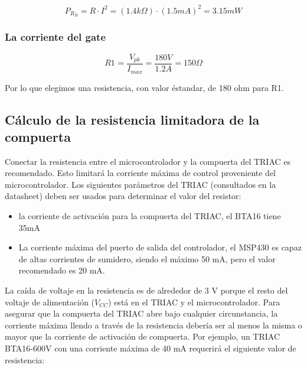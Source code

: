     \begin{equation}
        P_{R_{B}}
        =   R \cdot I^2
        =   (1.4k\Omega) \cdot (1.5mA)^2
        =   3.15mW
    \end{equation}
    
    \subsubsection*{La corriente del gate}
        \begin{equation}
            R1_{ }   
            =   \frac { V_{pk} } { I_{max} }    
            =   \frac { 180V } { 1.2A } = 150\Omega
        \end{equation}
        
        Por lo que elegimos una resistencia, con valor éstandar, de 180 ohm para R1.

\subsection{Cálculo de la resistencia limitadora de la compuerta}
    Conectar la resistencia entre el microcontrolador y la compuerta del TRIAC es recomendado. Esto limitará la corriente máxima de control proveniente del microcontrolador. Los siguientes parámetros del TRIAC (consultados en la datasheet) deben ser usados para determinar el valor del resistor:\\

    \begin{itemize}
        \item {
            \setlength{\parskip}{-1mm}
            la corriente de activación para la compuerta del TRIAC, el BTA16 tiene 35mA
            }
        \item {
            \setlength{\parskip}{-1mm}
            La corriente máxima del puerto de salida del controlador, el MSP430 es capaz de altas corrientes de sumidero, siendo el máximo 50 mA, pero el valor recomendado es 20 mA.
            }
    \end{itemize}

    La caída de voltaje en la resistencia es de alrededor de 3 V porque el resto del voltaje de alimentación ($V_{CC}$) está en el TRIAC y el microcontrolador. Para asegurar que la compuerta del TRIAC abre bajo cualquier circunstancia, la corriente máxima llendo a través de la resistencia debería ser al menos la misma o mayor que la corriente de activación de compuerta. Por ejemplo, un TRIAC BTA16-600V con una corriente máxima de 40 mA requerirá el siguiente valor de resistencia:\\

